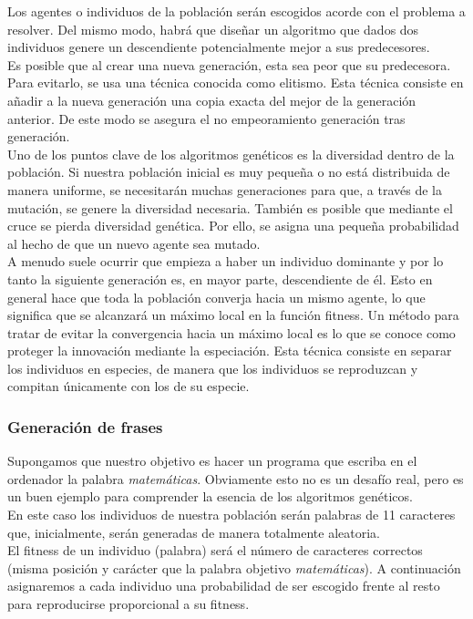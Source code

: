 \documentclass{article}
\begin{document}
Los agentes o individuos de la población serán escogidos acorde con el problema a resolver. Del mismo modo, habrá que diseñar un algoritmo que dados dos individuos genere un descendiente potencialmente mejor a sus predecesores.\\

Es posible que al crear una nueva generación, esta sea peor que su predecesora. Para evitarlo, se usa una técnica conocida como elitismo. Esta técnica consiste en añadir a la nueva generación una copia exacta del mejor de la generación anterior. De este modo se asegura el no empeoramiento generación tras generación.\\

Uno de los puntos clave de los algoritmos genéticos es la diversidad dentro de la población. Si nuestra población inicial es muy pequeña o no está distribuida de manera uniforme, se necesitarán muchas generaciones para que, a través de la mutación, se genere la diversidad necesaria. También es posible que mediante el cruce se pierda diversidad genética. Por ello, se asigna una pequeña probabilidad al hecho de que un nuevo agente sea mutado.\\

A menudo suele ocurrir que empieza a haber un individuo dominante y por lo tanto la siguiente generación es, en mayor parte, descendiente de él. Esto en general hace que toda la población converja hacia un mismo agente, lo que significa que se alcanzará un máximo local en la función fitness. Un método para tratar de evitar la convergencia hacia un máximo local es lo que se conoce como proteger la innovación mediante la especiación.
Esta técnica consiste en separar los individuos en especies, de manera que los individuos se reproduzcan y compitan únicamente con los de su especie.

\subsubsection{Generación de frases}
Supongamos que nuestro objetivo es hacer un programa que escriba en el ordenador la palabra \textit{matemáticas}. Obviamente esto no es un desafío real, pero es un buen ejemplo para comprender la esencia de los algoritmos genéticos.\\
En este caso los individuos de nuestra población serán palabras de 11 caracteres que, inicialmente, serán generadas de manera totalmente aleatoria.\\

El fitness de un individuo (palabra) será el número de caracteres correctos (misma posición y carácter que la palabra objetivo \textit{matemáticas}). A continuación asignaremos a cada individuo una probabilidad de ser escogido frente al resto para reproducirse proporcional a su fitness.\\
\end{document}
